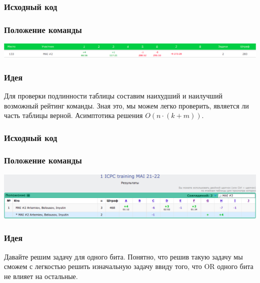 \documentclass[12pt]{article}
\begin{document}
\subsubsection*{Исходный код}

\subsubsection*{Положение команды}
\includegraphics[scale=0.25]{images/sib.png}\newline\noindent
\pagebreak


\subsubsection*{Идея}
Для проверки подлинности таблицы составим наихудший и наилучший возможный рейтинг команды. Зная это, мы можем легко проверить, является ли часть таблицы верной. Асимптотика решения $O(n \cdot (k + m))$.

\subsubsection*{Исходный код}

\subsubsection*{Положение команды}
\includegraphics[scale=0.25]{images/training1mai21.png}\newline\noindent
\pagebreak


\subsubsection*{Идея}
Давайте решим задачу для одного бита. Понятно, что решив такую задачу мы сможем с легкостью решить изначальную задачу ввиду того, что OR одного бита не влияет на остальные. 
\end{document}
